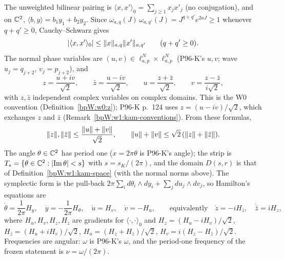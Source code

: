 \begin{convention}
The unweighted bilinear pairing is $\langle x,x'\rangle_0=\sum_{j\ge1}x_jx'_j$ (no conjugation), and on $\mathbb{C}^2$,
$\langle b,y\rangle=b_1y_1+b_2y_2$. Since $\omega_{a,q}(J)\,\omega_{a,q'}(J)=J^{q+q'}e^{2aJ}\ge1$ whenever
$q+q'\ge0$, Cauchy--Schwarz gives
\begin{equation}\label{bpW:w4:pairing}
\lvert \langle x,x'\rangle_0\rvert\le\lVert x\rVert_{a,q}\lVert x'\rVert_{a,q'}\qquad(q+q'\ge0).
\end{equation}
The normal phase variables are $(u,v)\in\ell^N_{a,p}\times\ell^N_{a,p}$ (P96-K's $u,v$; wave $u_j=q_{j+2}$,
$v_j=p_{j+2}$), and
\[z=\frac{u+iv}{\sqrt2},\qquad\bar z=\frac{u-iv}{\sqrt2},\qquad u=\frac{z+\bar z}{\sqrt2},\qquad v=\frac{z-\bar z}{i\sqrt2},\]
with $z,\bar z$ independent complex variables on complex domains. This is the W0 convention
(Definition~\ref{bpW:w0:z}); P96-K p.~124 uses $z=(u-iv)/\sqrt2$, which exchanges $z$ and $\bar z$
(Remark~\ref{bpW:w1:kam-conventions}). From these formulas,
\begin{equation}\label{bpW:w4:zu}
\lVert z\rVert,\lVert \bar z\rVert\le\frac{\lVert u\rVert+\lVert v\rVert}{\sqrt2},\qquad\lVert u\rVert+\lVert v\rVert\le\sqrt2\,(\lVert z\rVert+\lVert \bar z\rVert).
\end{equation}
The angle $\theta\in\mathbb{C}^2$ has period one ($x=2\pi\theta$ is P96-K's angle); the strip is
$T_s=\{\theta\in\mathbb{C}^2:\lvert \operatorname{Im}\theta\rvert<s\}$ with $s=s_K/(2\pi)$, and the domain $D(s,r)$ is that of
Definition~\ref{bpW:w1:kam-space} (with the normal norms above). The symplectic form is the pull-back
$2\pi\sum_id\theta_i\wedge dy_i+\sum_jdu_j\wedge dv_j$, so Hamilton's equations are
\begin{equation}\label{bpW:w4:hameq}
\dot\theta=\frac{1}{2\pi}H_y,\quad\dot y=-\frac{1}{2\pi}H_\theta,\quad\dot u=H_v,\quad\dot v=-H_u,\qquad
\text{equivalently}\quad\dot z=-iH_{\bar z},\quad\dot{\bar z}=iH_z,
\end{equation}
where $H_u,H_v,H_z,H_{\bar z}$ are gradients for $\langle\cdot,\cdot\rangle_0$ and
$H_z=(H_u-iH_v)/\sqrt2$, $H_{\bar z}=(H_u+iH_v)/\sqrt2$, $H_u=(H_z+H_{\bar z})/\sqrt2$, $H_v=i(H_z-H_{\bar z})/\sqrt2$.
Frequencies are angular: $\omega$ is P96-K's $\omega$, and the period-one frequency of the frozen statement is
$\nu=\omega/(2\pi)$.
\end{convention}

